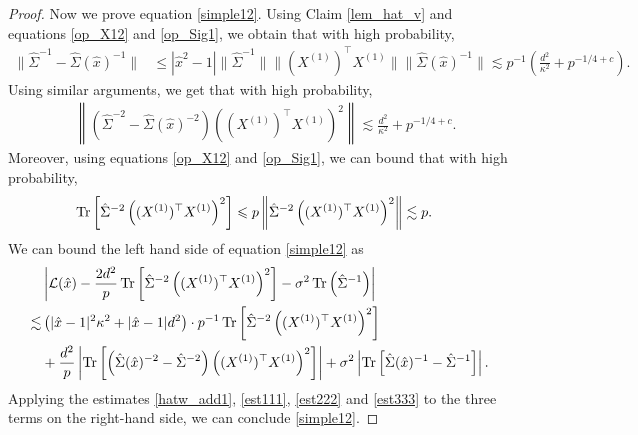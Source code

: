 \begin{proof}
Now we prove equation \eqref{simple12}. Using Claim \ref{lem_hat_v} and equations \eqref{op_X12} and \eqref{op_Sig1}, we obtain that with high probability,
\begin{align}
 \|\hat\Sigma^{-1}-\hat\Sigma(\hat x)^{-1}\| &\le |\hat x^2-1|\|\hat\Sigma^{-1}\| \| (X^{(1)})^\top X^{(1)}\|\|\hat\Sigma(\hat x)^{-1}\|  \lesssim p^{-1}\left(\frac{d^2}{\kappa^2} + p^{-1/4+c}\right).\label{est111}
\end{align}
Using similar arguments, we get that with high probability,
\begin{align}\label{est222}
&\left\|\left(\hat\Sigma^{-2}-\hat\Sigma(\hat x)^{-2}\right)\left((X^{(1)})^\top X^{(1)} \right)^2\right\| \lesssim  \frac{d^2}{\kappa^2} + p^{-1/4+c} .
\end{align}
Moreover, using equations \eqref{op_X12} and \eqref{op_Sig1}, we can bound that with high probability,
\begin{align}
& \operatorname{Tr}\left[ \hat\Sigma^{-2} \left((X^{(1)})^{\top}X^{(1)}\right)^2\right]  \leqslant p \left\| \hat\Sigma^{-2} \left((X^{(1)})^{\top}X^{(1)}\right)^2 \right\|\lesssim p.\label{est333}
\end{align}
We can bound the left hand side of equation \eqref{simple12} as
\begin{align*}
&\left|\mathcal L(\hat x)-\frac{2d^2}{p}\operatorname{Tr}\left[\hat\Sigma^{-2} \left((X^{(1)})^\top X^{(1)} \right)^2\right] -\sigma^2  \operatorname{Tr}\left({\hat\Sigma^{-1}  }\right)\right| \\
\lesssim &\left(|\hat x-1|^2 \kappa^2 + |\hat x-1|d^2\right)\cdot p^{-1}\operatorname{Tr}\left[ \hat\Sigma^{-2} \left((X^{(1)})^{\top}X^{(1)}\right)^2 \right] \\
&+ \frac{d^2}{p}\left|\operatorname{Tr}\left[\left(\hat\Sigma(\hat x)^{-2}-\hat\Sigma^{-2}\right) \left((X^{(1)})^\top X^{(1)} \right)^2\right]\right|+ \sigma^2  \left|\operatorname{Tr}\left[\hat\Sigma(\hat x)^{-1}-\hat\Sigma^{-1}  \right]\right|.
\end{align*}
Applying the estimates \eqref{hatw_add1}, \eqref{est111}, \eqref{est222} and \eqref{est333} to the three terms on the right-hand side, we can conclude \eqref{simple12}.


\end{proof}
